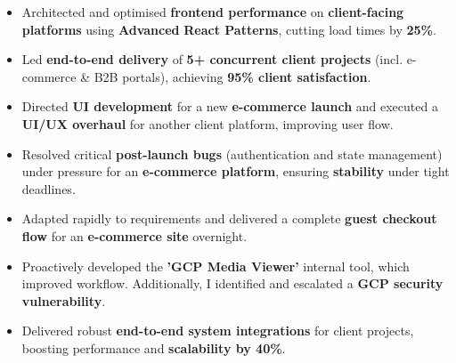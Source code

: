\documentclass[10pt,a4paper,ragged2e]{altacv}
\begin{document}
\begin{itemize}
\item Architected and optimised \textbf{frontend performance} on \textbf{client-facing platforms} using \textbf{Advanced} \textbf{React Patterns}, cutting load times by \textbf{25\%}.
\item Led \textbf{end-to-end delivery} of \textbf{5+ concurrent client projects} (incl. e-commerce \& B2B portals), achieving \textbf{95\% client satisfaction}.
\item Directed \textbf{UI development} for a new \textbf{e-commerce launch} and executed a \textbf{UI/UX overhaul} for another client platform, improving user flow.
\item Resolved critical \textbf{post-launch bugs} (authentication and state management) under pressure for an \textbf{e-commerce platform}, ensuring \textbf{stability} under tight deadlines.
\item Adapted rapidly to requirements and delivered a complete \textbf{guest checkout flow} for an \textbf{e-commerce site} overnight.
\item Proactively developed the\textbf{ 'GCP Media Viewer'} internal tool, which improved workflow. Additionally, I identified and escalated a \textbf{GCP security vulnerability}.
\item Delivered robust \textbf{end-to-end system integrations} for client projects, boosting performance and \textbf{scalability by 40\%}.

\end{itemize}

\divider
\end{document}
